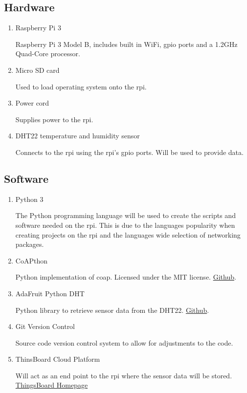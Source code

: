 \subsection{Hardware}
\begin{enumerate}
    \item Raspberry Pi 3

        Raspberry Pi 3 Model B, includes built in WiFi, \gls{gpio} ports and a 1.2GHz Quad-Core processor.
    \item Micro SD card
    
        Used to load operating system onto the \gls{rpi}.
    \item Power cord
    
        Supplies power to the \gls{rpi}.
    \item DHT22 temperature and humidity sensor
    
        Connects to the \gls{rpi} using the \gls{rpi}'s \gls{gpio} ports. Will be used to provide data.

\end{enumerate}

\subsection{Software}
\begin{enumerate}
    \item Python 3

        The Python programming language will be used to create the scripts and software needed on the \gls{rpi}.
        This is due to the languages popularity when creating projects on the \gls{rpi} and the languages wide selection
        of networking packages.
    \item CoAPthon
    
        Python implementation of \gls{coap}. Licensed under the MIT license. \href{https://github.com/Tanganelli/CoAPthon}{Github}.

    \item AdaFruit Python DHT
        
        Python library to retrieve sensor data from the DHT22. \href{https://github.com/adafruit/Adafruit_Python_DHT}{Github}.

    \item Git Version Control
    
        Source code version control system to allow for adjustments to the code.

    \item ThinsBoard Cloud Platform
    
        Will act as an end point to the \gls{rpi} where the sensor data will be stored. \href{https://thingsboard.io}{ThingsBoard Homepage}
\end{enumerate}